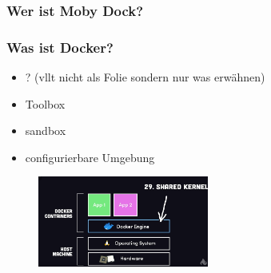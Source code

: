 \documentclass[22pt,handout]{beamer}
\begin{document}
\begin{frame}[t]
    \frametitle{Wer ist Moby Dock?}\pause
\end{frame}

\begin{frame}[t]
    \frametitle{Was ist Docker?}
    \begin{itemize}
        \item ? (vllt nicht als Folie sondern nur was erwähnen)
        \item Toolbox
        \item sandbox
        \item configurierbare Umgebung
    \end{itemize} 
    \begin{figure}[h]
        \centering
        \includegraphics[width=0.5\textwidth]{Bilder/Docker Concept.png}
    \end{figure}
\end{frame}
\end{document}

